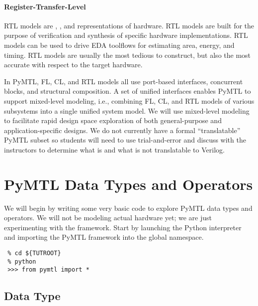 \documentclass{cbxdoc}
\begin{document}
\paragraph{Register-Transfer-Level}
RTL models are , , and
 representations of hardware. RTL models are built for
the purpose of verification and synthesis of specific hardware
implementations. RTL models can be used to drive EDA toolflows for
estimating area, energy, and timing. RTL models are usually the most
tedious to construct, but also the most accurate with respect to the
target hardware.

\smallskip
In PyMTL, FL, CL, and RTL models all use port-based interfaces,
concurrent blocks, and structural composition. A set of unified
interfaces enables PyMTL to support mixed-level modeling, i.e., combining
FL, CL, and RTL models of various subsystems into a single unified system
model. We will use mixed-level modeling to facilitate rapid design space
exploration of both general-purpose and application-specific designs.
 We do not currently
have a formal ``translatable'' PyMTL subset so students will need to use
trial-and-error and discuss with the instructors to determine what is and
what is not translatable to Verilog.


\section{PyMTL Data Types and Operators}
\label{sec-basics}

We will begin by writing some very basic code to explore PyMTL data types
and operators. We will not be modeling actual hardware yet; we are just
experimenting with the framework. Start by launching the Python
interpreter and importing the PyMTL framework into the global namespace.

\begin{verbatim}
 % cd ${TUTROOT}
 % python
 >>> from pymtl import *
\end{verbatim}

\subsection{ Data Type}
\label{sec-basics-bits}
\end{document}
